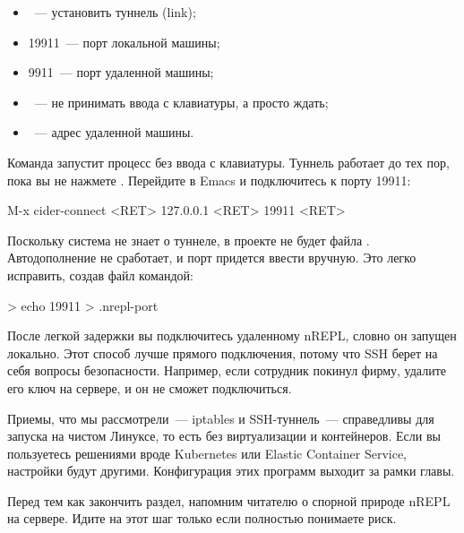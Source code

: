 \begin{itemize}

\item
  ~--- установить туннель (link);

\item
  19911~--- порт локальной машины;

\item
  9911~--- порт удаленной машины;

\item
  ~--- не принимать ввода с клавиатуры, а просто ждать;

\item
  ~--- адрес удаленной машины.

\end{itemize}

Команда запустит процесс  без ввода с клавиатуры. Туннель работает до тех пор, пока вы не нажмете . Перейдите в Emacs и подключитесь к порту 19911:

\begin{english}
  \begin{clojure}
M-x cider-connect <RET> 127.0.0.1 <RET> 19911 <RET>
  \end{clojure}
\end{english}

Поскольку система не знает о туннеле, в проекте не будет файла . Автодополнение не сработает, и порт придется ввести вручную. Это легко исправить, создав файл командой:

\begin{english}
  \begin{bash}
> echo 19911 > .nrepl-port
  \end{bash}
\end{english}

После легкой задержки вы подключитесь удаленному nREPL, словно он запущен локально. Этот способ лучше прямого подключения, потому что SSH берет на себя вопросы безопасности. Например, если сотрудник покинул фирму, удалите его ключ на сервере, и он не сможет подключиться.

Приемы, что мы рассмотрели~--- iptables и SSH-туннель~--- справедливы для запуска на чистом Линуксе, то есть без виртуализации и контейнеров. Если вы пользуетесь решениями вроде Kubernetes или Elastic Container Service, настройки будут другими. Конфигурация этих программ выходит за рамки главы.

Перед тем как закончить раздел, напомним читателю о спорной природе nREPL на сервере. Идите на этот шаг только если полностью понимаете риск.

